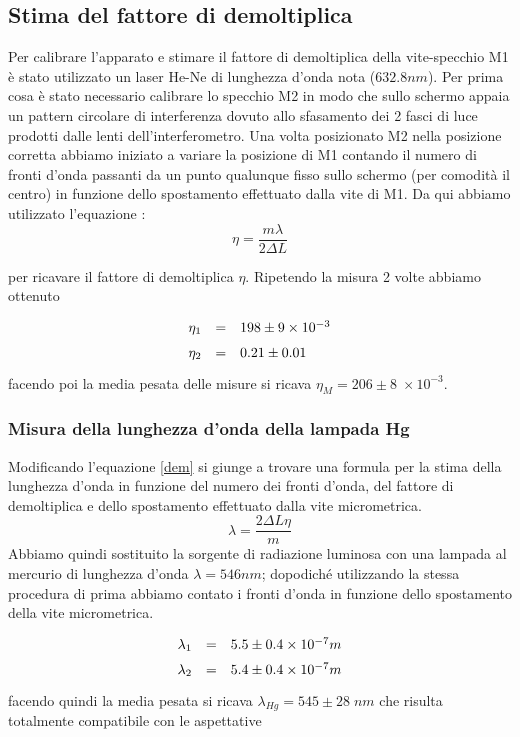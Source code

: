 \documentclass[10pt, a4paper, italian]{article}
\begin{document}
\subsection{Stima del fattore di demoltiplica}
Per calibrare l'apparato e stimare il fattore di demoltiplica della vite-specchio M1 è stato utilizzato un laser He-Ne di lunghezza d'onda nota ($632.8 nm$).
Per prima cosa è stato necessario calibrare lo specchio M2 in modo che sullo schermo appaia un pattern circolare di interferenza dovuto allo sfasamento dei 2 fasci di luce prodotti dalle lenti dell'interferometro.
Una volta posizionato M2 nella posizione corretta abbiamo iniziato a variare la posizione di M1 contando il numero di fronti d'onda passanti da un punto qualunque fisso sullo schermo (per comodità il centro) in funzione dello spostamento effettuato dalla vite di M1. Da qui abbiamo utilizzato l'equazione :
\begin{equation}
\eta= \frac{m \lambda}{2 \Delta L}
\label{dem}
\end{equation}

per ricavare il fattore di demoltiplica $\eta$.
Ripetendo la misura 2 volte abbiamo ottenuto 
  \[
\def\arraystretch{1.5}
\begin{array}{rcl}
\eta_1 & = & 198 \pm 9 \times 10^{-3}\\
\eta_2 & = & 0.21 \pm 0.01\\
\end{array}
\]
facendo poi la media pesata delle misure si ricava $\eta_M =206 \pm 8 \; \times 10^{-3}$.

\subsubsection{Misura della lunghezza d'onda della lampada Hg}
Modificando l'equazione \ref{dem} si giunge a trovare una formula per la stima della lunghezza d'onda in funzione del numero dei fronti d'onda, del fattore di demoltiplica e dello spostamento effettuato dalla vite micrometrica.
\[
\lambda=\frac{2\Delta L \eta}{m}
\]
Abbiamo quindi sostituito la sorgente di radiazione luminosa con una lampada al mercurio di lunghezza d'onda $\lambda=546 nm$; dopodiché utilizzando la stessa procedura di prima abbiamo contato i fronti d'onda in funzione dello spostamento della vite micrometrica.
  \[
\def\arraystretch{1.5}
\begin{array}{rcl}
\lambda_1 & = & 5.5 \pm 0.4 \times 10^{-7} m\\
\lambda_2 & = & 5.4 \pm 0.4 \times 10^{-7} m\\
\end{array}
\]
facendo quindi la media pesata si ricava $\lambda _{Hg}=545\pm 28 \; nm$ che risulta totalmente compatibile con le aspettative
\end{document}
